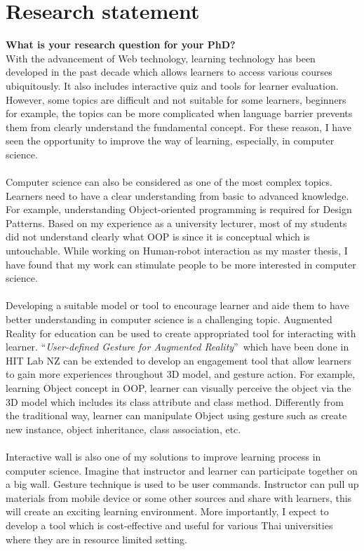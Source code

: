 \documentclass[11pt,a4paper,roman]{moderncv}        %
\begin{document}
\makecvtitle
\section{Research statement}
\textbf{What is your research question for your PhD?}
\\
With the advancement of Web technology, learning technology has been developed in the past decade which allows learners to access various courses ubiquitously.  It also includes interactive quiz and tools for learner evaluation. However, some topics are difficult and not suitable for some learners, beginners for example, the topics can be more complicated when language barrier prevents them from clearly understand the fundamental concept. For these reason, I have seen the opportunity to improve the way of learning, especially, in computer science.
\\
\\
Computer science can also be considered as one of the most complex topics. Learners need to have a clear understanding from basic to advanced knowledge. For example, understanding Object-oriented programming is required for Design Patterns. Based on my experience as a university lecturer, most of my students did not understand clearly what OOP is since it is conceptual which is untouchable. While working on Human-robot interaction as my master thesis, I have found that my work can stimulate people to be more interested in computer science. 
\\
\\
Developing a suitable model or tool to encourage learner and aide them to have better understanding in computer science is a challenging topic. Augmented Reality for education can be used to create appropriated tool for interacting with learner. ``\emph{User-defined Gesture for Augmented Reality}''\ which have been done in HIT Lab NZ can be extended to develop an engagement tool that allow learners to gain more experiences throughout 3D model, and gesture action. For example, learning Object concept in OOP, learner can visually perceive the object via the 3D model which includes its class attribute and class method. Differently from the traditional way, learner can manipulate Object using gesture such as create new instance, object inheritance, class association, etc.
\\
\\
Interactive wall is also one of my solutions to improve learning process in computer science.  Imagine that instructor and learner can participate together on a big wall. Gesture technique is used to be user commands. Instructor can pull up materials from mobile device or some other sources and share with learners, this will create an exciting learning environment. More importantly, I expect to develop a tool which is cost-effective and useful for various Thai universities where they are in resource limited setting.
\end{document}

